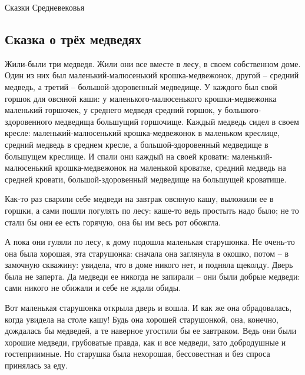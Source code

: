




\begin{center}
    { %
        \textcolor{bordercol}{\fontsize{36pt}{40pt}\selectfont Сказки Средневековья}
    }
\end{center}

\subsection*{Сказка о трёх медведях}

Жили-были три медведя. Жили они все вместе в лесу, в своем собственном доме. Один из них был маленький-малюсенький крошка-медвежонок, другой – средний медведь, а третий – большой-здоровенный медведище. У каждого был свой горшок для овсяной каши: у маленького-малюсенького крошки-медвежонка маленький горшочек, у среднего медведя средний горшок, у большого-здоровенного медведища большущий горшочище. Каждый медведь сидел в своем кресле: маленький-малюсенький крошка-медвежонок в маленьком креслице, средний медведь в среднем кресле, а большой-здоровенный медведище в большущем креслище. И спали они каждый на своей кровати: маленький-малюсенький крошка-медвежонок на маленькой кроватке, средний медведь на средней кровати, большой-здоровенный медведище на большущей кроватище.

Как-то раз сварили себе медведи на завтрак овсяную кашу, выложили ее в горшки, а сами пошли погулять по лесу: каше-то ведь простыть надо было; не то стали бы они ее есть горячую, она бы им весь рот обожгла.

А пока они гуляли по лесу, к дому подошла маленькая старушонка. Не очень-то она была хорошая, эта старушонка: сначала она заглянула в окошко, потом – в замочную скважину: увидела, что в доме никого нет, и подняла щеколду. Дверь была не заперта. Да медведи ее никогда не запирали – они были добрые медведи: сами никого не обижали и себе не ждали обиды.

Вот маленькая старушонка открыла дверь и вошла. И как же она обрадовалась, когда увидела на столе кашу! Будь она хорошей старушонкой, она, конечно, дождалась бы медведей, а те наверное угостили бы ее завтраком. Ведь они были хорошие медведи, грубоватые правда, как и все медведи, зато добродушные и гостеприимные. Но старушка была нехорошая, бессовестная и без спроса принялась за еду.

